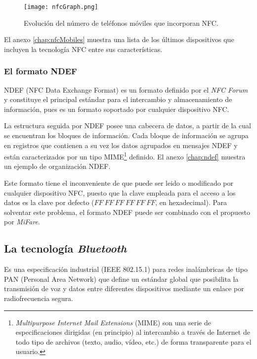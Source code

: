   \begin{figure}[!h]
    \begin{center}
      \texttt{[image: nfcGraph.png]}
      \caption{Evolución del número de teléfonos móviles que
      incorporan \acs{NFC}.}
      \label{fig:nfcGraph}
    \end{center}
  \end{figure}

El anexo \ref{chap:nfcMobiles} muestra una lista de los últimos dispositivos
que incluyen la tecnología \acs{NFC} entre sus características.

  \subsubsection{El formato \acs{NDEF}}
\acs{NDEF} (\acs{NFC} Data Exchange Format) es un formato definido por el
\emph{NFC Forum} y constituye el principal estándar para el intercambio y
almacenamiento de información, pues es un formato soportado por cualquier 
dispositivo \acs{NFC}.

La estructura seguida por \acs{NDEF} posee una cabecera de datos, a partir de
la cual se encuentran los bloques de información. Cada bloque de información
se agrupa en registros que contienen a su vez los datos agrupados en mensajes
\acs{NDEF} y están caracterizados por un tipo \acs{MIME}\footnote{
\emph{Multipurpose Internet Mail Extensions} (\acs{MIME}) son una serie
de especificaciones dirigidas (en principio) al intercambio a través de
Internet de todo tipo de archivos (texto, audio, vídeo, etc.) de forma
transparente para el usuario.} definido. El
anexo \ref{chap:ndef} muestra un ejemplo de organización \acs{NDEF}.

Este formato tiene el inconveniente de que puede ser leido o modificado por
cualquier dispositivo \acs{NFC}, puesto que la clave empleada para el acceso
a los datos es la clave por defecto ($FF\ FF\ FF\ FF\ FF\ FF$, en hexadecimal).
Para solventar este problema, el formato \acs{NDEF} puede ser combinado con
el propuesto por \emph{MiFare}.

  \subsection{La tecnología \emph{Bluetooth}}
  \label{subsec:bluetooth}
Es una especificación industrial (\acs{IEEE} 802.15.1) para redes inalámbricas
de tipo \acs{PAN} (Personal Area Network) que define un estándar global que
posibilita la transmisión de voz y datos entre diferentes dispositivos mediante
un enlace por radiofrecuencia segura.

